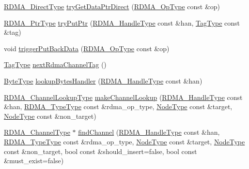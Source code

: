 \begin{DoxyCompactItemize}
\item 
\hyperlink{structvt_1_1rdma_1_1_r_d_m_a_manager_a8bce76d1b441ca17daf84835eb9a7dec}{R\+D\+M\+A\+\_\+\+Direct\+Type} \hyperlink{structvt_1_1rdma_1_1_r_d_m_a_manager_a49b9fd1ac1fcc391a45b7a4c8c796a2b}{try\+Get\+Data\+Ptr\+Direct} (\hyperlink{namespacevt_1_1rdma_a9b966d9780a2b41afe7cd7b7b4b20300}{R\+D\+M\+A\+\_\+\+Op\+Type} const \&op)
\item 
\hyperlink{namespacevt_aab05b4a584f7ee835a6d0f66915cf59b}{R\+D\+M\+A\+\_\+\+Ptr\+Type} \hyperlink{structvt_1_1rdma_1_1_r_d_m_a_manager_afe917ba8c9a44175dd0766f3f0321e61}{try\+Put\+Ptr} (\hyperlink{namespacevt_a10442579ec4e7ebef223818e64bcf908}{R\+D\+M\+A\+\_\+\+Handle\+Type} const \&han, \hyperlink{namespacevt_a84ab281dae04a52a4b243d6bf62d0e52}{Tag\+Type} const \&tag)
\item 
void \hyperlink{structvt_1_1rdma_1_1_r_d_m_a_manager_a02d9c1d18f6f15797ee2592613175069}{trigger\+Put\+Back\+Data} (\hyperlink{namespacevt_1_1rdma_a9b966d9780a2b41afe7cd7b7b4b20300}{R\+D\+M\+A\+\_\+\+Op\+Type} const \&op)
\item 
\hyperlink{namespacevt_a84ab281dae04a52a4b243d6bf62d0e52}{Tag\+Type} \hyperlink{structvt_1_1rdma_1_1_r_d_m_a_manager_a0c9f73f027924ee73cb2d9a8af520e1e}{next\+Rdma\+Channel\+Tag} ()
\item 
\hyperlink{namespacevt_aab8d55968084610ce3b17057981e9300}{Byte\+Type} \hyperlink{structvt_1_1rdma_1_1_r_d_m_a_manager_a3d8b57617a652d55cf2714930d618c05}{lookup\+Bytes\+Handler} (\hyperlink{namespacevt_a10442579ec4e7ebef223818e64bcf908}{R\+D\+M\+A\+\_\+\+Handle\+Type} const \&han)
\item 
\hyperlink{structvt_1_1rdma_1_1_r_d_m_a_manager_a3df5b264f344d9d4530a96264782a725}{R\+D\+M\+A\+\_\+\+Channel\+Lookup\+Type} \hyperlink{structvt_1_1rdma_1_1_r_d_m_a_manager_a8f6d4973f9ea76e2be99d1aac105fff7}{make\+Channel\+Lookup} (\hyperlink{namespacevt_a10442579ec4e7ebef223818e64bcf908}{R\+D\+M\+A\+\_\+\+Handle\+Type} const \&han, \hyperlink{namespacevt_1_1rdma_ac848e1d9da43db6294bd06f83e5d3946}{R\+D\+M\+A\+\_\+\+Type\+Type} const \&rdma\+\_\+op\+\_\+type, \hyperlink{namespacevt_a866da9d0efc19c0a1ce79e9e492f47e2}{Node\+Type} const \&target, \hyperlink{namespacevt_a866da9d0efc19c0a1ce79e9e492f47e2}{Node\+Type} const \&non\+\_\+target)
\item 
\hyperlink{structvt_1_1rdma_1_1_r_d_m_a_manager_ad6a7e417dca07fe5743318e1153677a8}{R\+D\+M\+A\+\_\+\+Channel\+Type} $\ast$ \hyperlink{structvt_1_1rdma_1_1_r_d_m_a_manager_a51f828fcbb55e1b4c883746c490b77f0}{find\+Channel} (\hyperlink{namespacevt_a10442579ec4e7ebef223818e64bcf908}{R\+D\+M\+A\+\_\+\+Handle\+Type} const \&han, \hyperlink{namespacevt_1_1rdma_ac848e1d9da43db6294bd06f83e5d3946}{R\+D\+M\+A\+\_\+\+Type\+Type} const \&rdma\+\_\+op\+\_\+type, \hyperlink{namespacevt_a866da9d0efc19c0a1ce79e9e492f47e2}{Node\+Type} const \&target, \hyperlink{namespacevt_a866da9d0efc19c0a1ce79e9e492f47e2}{Node\+Type} const \&non\+\_\+target, bool const \&should\+\_\+insert=false, bool const \&must\+\_\+exist=false)
\end{DoxyCompactItemize}

